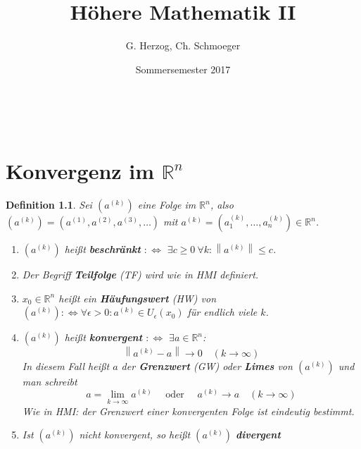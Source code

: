 \documentclass[12pt]{extreport} %
\title{Höhere Mathematik II}
\author{G. Herzog, Ch. Schmoeger}
\date{Sommersemester 2017}
\makeatletter
\newcommand{\R}{\mathbb{R}}
\theoremstyle{named}
\theoremstyle{nnamed}
\theoremstyle{itshape}
\newtheorem*{definition}{Definition}
\theoremstyle{normal}
\def\maketitle{ \begin{titlepage} 
			~\vspace{3cm} 
		\begin{center} {\Huge \@title} \end{center} 
	 		\vspace*{1cm} 
	 	\begin{center} {\large \@author} \end{center} 
	 	\begin{center} \@date \end{center} 
	 		\vspace*{7cm} 
	 	\begin{center} \@publishers \end{center} 
	 		\vfill 
	\end{titlepage} }
\makeatother
\begin{document}
\begin{titlepage}
	\maketitle
	\thispagestyle{empty}
\end{titlepage}
	
\tableofcontents
\thispagestyle{empty}
  
\chapter{Konvergenz im \texorpdfstring{$\R^{n}$}{Rn}}
     
     
      
\begin{definition}
	Sei $\left(a^{(k)}\right)$ eine Folge im $\R^{n}$, also $\left( a^{(k)} \right) = \left( a^{(1)}, a^{(2)}, a^{(3)}, \dotsc \right)$ mit $a^{(k)} = \left(a_{1}^{(k)}, \dotsc, a_{n}^{(k)} \right) \in \R^{n}$.
	\begin{enumerate} 
		\item $\left( a^{(k)} \right)$ hei{\ss}t \textbf{beschränkt} $: \iff$ $\exists c \geq 0 ~\forall k : \left\| a^{(k)} \right\| \leq c$.
		\item Der Begriff \textbf{Teilfolge} (TF) wird wie in HMI definiert.
		\item $x_{0} \in \R^{n}$ hei{\ss}t ein \textbf{Häufungswert} (HW) von $\left( a^{(k)} \right) : \iff \forall \epsilon > 0: a^{(k)} \in U_{\epsilon}(x_{0})$ für endlich viele $k$.
		\item $\left( a^{(k)}\right)$ hei{\ss}t \textbf{konvergent} $: \iff$ $\exists a \in \R^{n}$:
			\[ \left\| a^{(k)} - a \right\| \longrightarrow 0 \quad (k \rightarrow \infty) \]
			In diesem Fall hei{\ss}t $a$ der \textbf{Grenzwert} (GW) oder \textbf{Limes} von $\left( a^{(k)} \right)$ und man schreibt 
			\[ a = \lim_{k \rightarrow \infty} a^{(k)} \quad \text{ oder } \quad a^{(k)} \longrightarrow a \quad (k \rightarrow \infty) \] 	
			Wie in HMI: der Grenzwert einer konvergenten Folge ist eindeutig bestimmt. 
		\item Ist $\left( a^{(k)} \right)$ nicht konvergent, so hei{\ss}t $\left( a^{(k)} \right)$ \textbf{divergent}
	\end{enumerate}
\end{definition}
\end{document}
